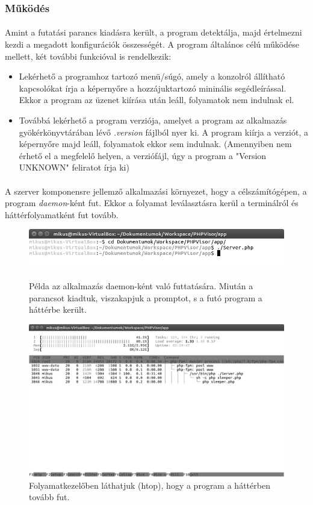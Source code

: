 \documentclass[12pt]{report}
\begin{document}
  \subsubsection{Működés}
  \paragraph{}
  Amint a futatási parancs kiadásra került, a program detektálja, majd értelmezni kezdi a megadott konfigurációk összességét.
  A program általános célú működése mellett, két további funkcióval is rendelkezik:
  \begin{itemize}
  \item Lekérhető a programhoz tartozó menü/súgó, amely a konzolról állítható kapcsolókat írja a képernyőre a hozzájuktartozó mininális segédleírással. Ekkor a program az üzenet kiírása után leáll, folyamatok nem indulnak el.
  \item Továbbá lekérhető a program verziója, amelyet a program az alkalmazás gyökérkönyvtárában lévő \textit{.version} fájlból nyer ki. A program kiírja a verziót, a képernyőre majd leáll, folyamatok ekkor sem indulnak. (Amennyiben nem érhető el a megfelelő helyen, a verziófájl, úgy a program a "Version UNKNOWN" feliratot írja ki)
  \end{itemize}
  \paragraph{}
  A szerver komponensre jellemző alkalmazási környezet, hogy a célszámítógépen, a program \textit{daemon}-ként fut. Ekkor a folyamat leválasztásra kerül a terminálról és háttérfolyamatként fut tovább. 
  \begin{figure}[ht]
  \centering
  \includegraphics[width=12cm]{pics/prompt.png}
	  \caption{Példa az alkalmazás daemon-ként való futtatására.
      Miután a parancsot kiadtuk, viszakapjuk a promptot, s a futó program a háttérbe került. \newline}
   \includegraphics[width=12cm]{pics/htop.png}
	  \caption{Folyamatkezelőben láthatjuk (htop), hogy a program a háttérben tovább fut.}
  \end{figure}
  
\end{document}
